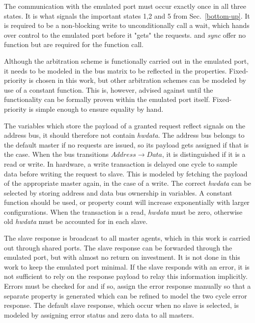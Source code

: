 The communication with the emulated port must occur exactly once in all three states. It is what signals the important states 1,2 and 5 from Sec.~\ref{bottom-up}. It is required to be a non-blocking write to unconditionally call a wait, which hands over control to the emulated port before it "gets" the requests.  and \textit{sync} offer no function but are required for the function call.   \par
Although the arbitration scheme is functionally carried out in the emulated port, it needs to be modeled in the bus matrix to be reflected in the properties. Fixed-priority is chosen in this work, but other arbitration schemes can be modeled by use of a constant function. This is, however, advised against until the functionality can be formally proven within the emulated port itself. Fixed-priority is simple enough to ensure equality by hand. \par
The variables which store the payload of a granted request reflect signals on the address bus, it should therefore not contain \textit{hwdata}. The address bus belongs to the default master if no requests are issued, so its payload gets assigned if that is the case. When the bus transitions $Address\rightarrow Data$, it is distinguished if it is a read or write. In hardware, a write transaction is delayed one cycle to sample data before writing the request to slave. This is modeled by fetching the payload of the appropriate master again, in the case of a write. The correct \textit{hwdata} can be selected by storing address and data bus ownership in variables. A constant function should be used, or property count will increase exponentially with larger configurations. When the transaction is a read, \textit{hwdata} must be zero, otherwise old \textit{hwdata} must be accounted for in each slave. \par
The slave response is broadcast to all master agents, which in this work is carried out through shared ports. The slave response can be forwarded through the emulated port, but with almost no return on investment. It is not done in this work to keep the emulated port minimal. If the slave responds with an error, it is not sufficient to rely on the response payload to relay this information implicitly. Errors must be checked for and if so, assign the error response manually so that a separate property is generated which can be refined to model the two cycle error response. The default slave response, which occur when no slave is selected, is modeled by assigning error status and zero data to all masters.\par
